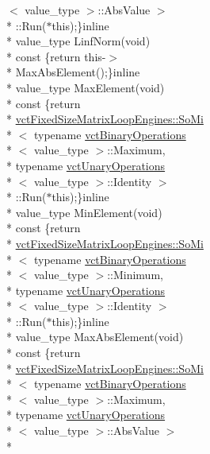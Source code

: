 \begin{DoxyCompactItemize}
$<$ value\-\_\-type $>$\-::Abs\-Value $>$\\*
\-::Run($\ast$this);\}inline \\*
value\-\_\-type Linf\-Norm(void) \\*
const \{return this-\/$>$\\*
Max\-Abs\-Element();\}inline \\*
value\-\_\-type Max\-Element(void) \\*
const \{return \\*
\hyperlink{classvct_fixed_size_matrix_loop_engines_1_1_so_mi}{vct\-Fixed\-Size\-Matrix\-Loop\-Engines\-::\-So\-Mi}\\*
$<$ typename \hyperlink{classvct_binary_operations}{vct\-Binary\-Operations}\\*
$<$ value\-\_\-type $>$\-::Maximum, \\*
typename \hyperlink{classvct_unary_operations}{vct\-Unary\-Operations}\\*
$<$ value\-\_\-type $>$\-::Identity $>$\\*
\-::Run($\ast$this);\}inline \\*
value\-\_\-type Min\-Element(void) \\*
const \{return \\*
\hyperlink{classvct_fixed_size_matrix_loop_engines_1_1_so_mi}{vct\-Fixed\-Size\-Matrix\-Loop\-Engines\-::\-So\-Mi}\\*
$<$ typename \hyperlink{classvct_binary_operations}{vct\-Binary\-Operations}\\*
$<$ value\-\_\-type $>$\-::Minimum, \\*
typename \hyperlink{classvct_unary_operations}{vct\-Unary\-Operations}\\*
$<$ value\-\_\-type $>$\-::Identity $>$\\*
\-::Run($\ast$this);\}inline \\*
value\-\_\-type Max\-Abs\-Element(void) \\*
const \{return \\*
\hyperlink{classvct_fixed_size_matrix_loop_engines_1_1_so_mi}{vct\-Fixed\-Size\-Matrix\-Loop\-Engines\-::\-So\-Mi}\\*
$<$ typename \hyperlink{classvct_binary_operations}{vct\-Binary\-Operations}\\*
$<$ value\-\_\-type $>$\-::Maximum, \\*
typename \hyperlink{classvct_unary_operations}{vct\-Unary\-Operations}\\*
$<$ value\-\_\-type $>$\-::Abs\-Value $>$\\*

\end{DoxyCompactItemize}
